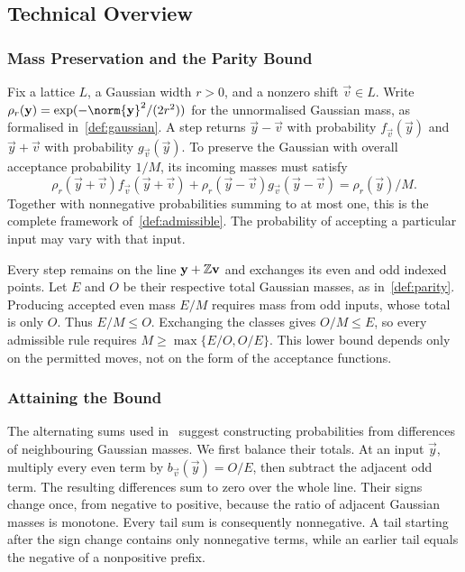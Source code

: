 \subsection{Technical Overview}

\subsubsection{Mass Preservation and the Parity Bound}

Fix a lattice $L$, a Gaussian width $r>0$, and a nonzero shift $\vec v\in L$. Write $\rho_r(\vec y)=\exp(-\norm{\vec y}^2/(2r^2))$ for the unnormalised Gaussian mass, as formalised in~\cref{def:gaussian}. A step returns $\vec y-\vec v$ with probability $f_{\vec v}(\vec y)$ and $\vec y+\vec v$ with probability $g_{\vec v}(\vec y)$. To preserve the Gaussian with overall acceptance probability $1/M$, its incoming masses must satisfy
\[
 \rho_r(\vec y+\vec v)f_{\vec v}(\vec y+\vec v)
 +\rho_r(\vec y-\vec v)g_{\vec v}(\vec y-\vec v)
 =\rho_r(\vec y)/M.
\]
Together with nonnegative probabilities summing to at most one, this is the complete framework of~\cref{def:admissible}. The probability of accepting a particular input may vary with that input.

Every step remains on the line $\mathbf{y}+\mathbb{Z}\mathbf{v}$ and exchanges its even and odd indexed points. Let $E$ and $O$ be their respective total Gaussian masses, as in~\cref{def:parity}. Producing accepted even mass $E/M$ requires mass from odd inputs, whose total is only $O$. Thus $E/M\le O$. Exchanging the classes gives $O/M\le E$, so every admissible rule requires $M\ge\max\{E/O,O/E\}$. This lower bound depends only on the permitted moves, not on the form of the acceptance functions.

\subsubsection{Attaining the Bound}

The alternating sums used in~\cite{GartnerFull} suggest constructing probabilities from differences of neighbouring Gaussian masses. We first balance their totals. At an input $\vec y$, multiply every even term by $b_{\vec v}(\vec y)=O/E$, then subtract the adjacent odd term. The resulting differences sum to zero over the whole line. Their signs change once, from negative to positive, because the ratio of adjacent Gaussian masses is monotone. Every tail sum is consequently nonnegative. A tail starting after the sign change contains only nonnegative terms, while an earlier tail equals the negative of a nonpositive prefix.

